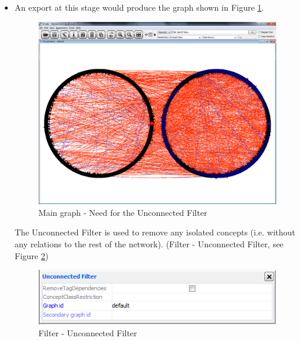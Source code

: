 \begin{itemize}
\item An export at this stage would produce the graph shown in Figure \ref{fig:need_unconnected}.
\begin{figure}[H]
\centering
\includegraphics[scale=0.3]{images/Oct12/need_unconnected.png} 
\caption{Main graph - Need for the Unconnected Filter}
\label{fig:need_unconnected}
\end{figure}
The Unconnected Filter is used to remove any isolated concepts (i.e. without any relations to the rest of the network).
(Filter - Unconnected Filter, see Figure \ref{fig:integrator_unconnected})
\begin{figure}[H]
\centering
\includegraphics[scale=0.6]{images/Oct12/unconnected.png} 
\caption{Filter - Unconnected Filter}
\label{fig:integrator_unconnected}
\end{figure}


\end{itemize}
